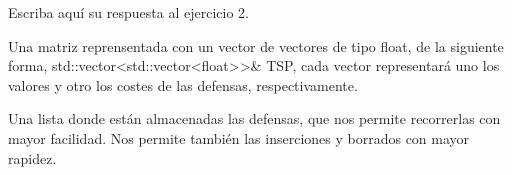 Escriba aquí su respuesta al ejercicio 2.

Una matriz reprensentada con un vector de vectores de tipo float, de la siguiente forma,
std::vector<std::vector<float>>& TSP, cada vector representará uno los valores y otro los costes de las defensas,
respectivamente.

Una lista donde están almacenadas las defensas, que nos permite recorrerlas con mayor facilidad.
Nos permite también las inserciones y borrados con mayor rapidez.